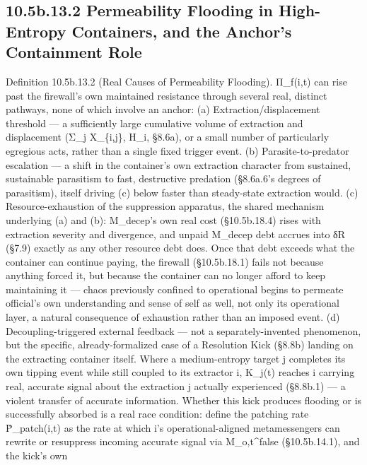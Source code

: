 \documentclass[
]{article}
\begin{document}
\hypertarget{b.13.2-permeability-flooding-in-high-entropy-containers-and-the-anchors-containment-role}{%
\subsection{10.5b.13.2 Permeability Flooding in High-Entropy Containers,
and the Anchor's Containment
Role}\label{b.13.2-permeability-flooding-in-high-entropy-containers-and-the-anchors-containment-role}}

Definition 10.5b.13.2 (Real Causes of Permeability Flooding). Π\_f(i,t)
can rise past the firewall's own maintained resistance through several
real, distinct pathways, none of which involve an anchor: (a)
Extraction/displacement threshold --- a sufficiently large cumulative
volume of extraction and displacement (Σ\_j X\_\{i,j\}, H\_i, §8.6a), or
a small number of particularly egregious acts, rather than a single
fixed trigger event. (b) Parasite-to-predator escalation --- a shift in
the container's own extraction character from sustained, sustainable
parasitism to fast, destructive predation (§8.6a.6's degrees of
parasitism), itself driving (c) below faster than steady-state
extraction would. (c) Resource-exhaustion of the suppression apparatus,
the shared mechanism underlying (a) and (b): M\_decep's own real cost
(§10.5b.18.4) rises with extraction severity and divergence, and unpaid
M\_decep debt accrues into δR (§7.9) exactly as any other resource debt
does. Once that debt exceeds what the container can continue paying, the
firewall (§10.5b.18.1) fails not because anything forced it, but because
the container can no longer afford to keep maintaining it --- chaos
previously confined to operational begins to permeate official's own
understanding and sense of self as well, not only its operational layer,
a natural consequence of exhaustion rather than an imposed event. (d)
Decoupling-triggered external feedback --- not a separately-invented
phenomenon, but the specific, already-formalized case of a Resolution
Kick (§8.8b) landing on the extracting container itself. Where a
medium-entropy target j completes its own tipping event while still
coupled to its extractor i, K\_j(t) reaches i carrying real, accurate
signal about the extraction j actually experienced (§8.8b.1) --- a
violent transfer of accurate information. Whether this kick produces
flooding or is successfully absorbed is a real race condition: define
the patching rate Ṗ\_patch(i,t) as the rate at which i's
operational-aligned metamessengers can rewrite or resuppress incoming
accurate signal via M\_o,t\^{}false (§10.5b.14.1), and the kick's own
\end{document}
